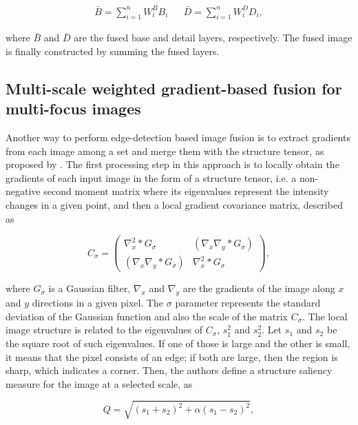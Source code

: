\begin{align}
\bar{B} = \sum_{i=1}^{n}W_{i}^{B}B_{i}
&&
\bar{D} = \sum_{i=1}^{n}W_{i}^{D}D_{i},
\end{align}

\noindent where $\bar{B}$ and $\bar{D}$ are the fused base and detail layers, respectively. The fused image is finally constructed by summing the fused layers.

\subsection{Multi-scale weighted gradient-based fusion for multi-focus images}

Another way to perform edge-detection based image fusion is to extract gradients from each image among a set and merge them with the structure tensor, as proposed by . The first processing step in this approach is to locally obtain the gradients of each input image in the form of a structure tensor, i.e. a non-negative second moment matrix where its eigenvalues represent the intensity changes in a given point, and then a local gradient covariance matrix, described as

\begin{equation}
C_{\sigma} =
    \begin{pmatrix}
        \nabla_{x}^{2} \ast G_{\sigma}
        &
        \left(
            \nabla_{x}\nabla_{y} \ast G_{\sigma}
        \right)
        \\
        \left(
            \nabla_{x}\nabla_{y} \ast G_{\sigma}
        \right)
        &
        \nabla_{x}^{2} \ast G_{\sigma}
    \end{pmatrix},
\end{equation}

\noindent where $G_{\sigma}$ is a Gaussian filter, $\nabla_{x}$ and $\nabla_{y}$ are the gradients of the image along $x$ and $y$ directions in a given pixel. The $\sigma$ parameter represents the standard deviation of the Gaussian function and also the scale of the matrix $C_{\sigma}$. The local image structure is related to the eigenvalues of $C_{\sigma}$, $s_{1}^{2}$ and $s_{2}^{2}$. Let $s_{1}$ and $s_{2}$ be the square root of such eigenvalues. If one of those is large and the other is small, it means that the pixel consists of an edge; if both are large, then the region is sharp, which indicates a corner. Then, the authors define a structure saliency measure for the image at a selected scale, as

\begin{equation}
\label{eqn:structure_saliency}
Q = \sqrt{(s_{1} + s_{2})^{2} + \alpha(s_{1} - s_{2})^{2}},
\end{equation}

